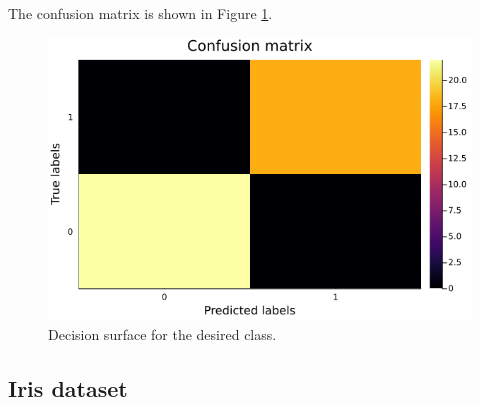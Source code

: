 \documentclass[12pt,a4paper]{article}
\begin{document}
The confusion matrix is shown in Figure \ref{fig:confusion-matrix-mlp-xor}.
\begin{figure}[H]
    \centering
    \includegraphics[scale=0.35]{../trab5 (MLP)/figs/xor-confusion-matrix.png}
    \caption{Decision surface for the desired class.}
    \label{fig:confusion-matrix-mlp-xor}
\end{figure}

\subsection{Iris dataset}
\end{document}
